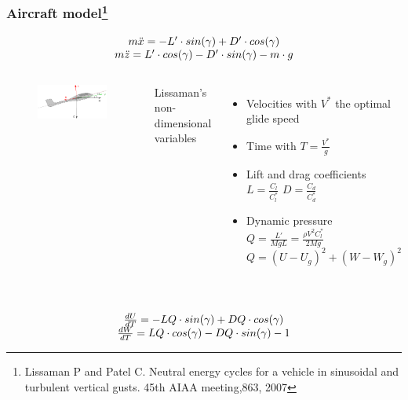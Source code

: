 \documentclass[compress]{beamer}
\begin{document}
\begin{frame}%
  \frametitle{Aircraft model\footnote{\tiny Lissaman P and Patel C. Neutral energy cycles for a vehicle in sinusoidal and turbulent vertical gusts. 45th AIAA meeting,863, 2007}}
  \begin{equation*}
    \begin{array}[c]{c}
      m \ddot{x} = -L' \cdot sin(\gamma) + D' \cdot cos(\gamma) \\
      m \ddot{z} = L' \cdot cos(\gamma) - D' \cdot sin(\gamma) - m \cdot g
    \end{array}
  \end{equation*}
  \begin{columns}
    \begin{figure}[h]
      \centering
      \includegraphics[width=1\textwidth]{./Figures/glider.eps}
    \end{figure}
    Lissaman's non-dimensional variables
    \begin{itemize}
      \item Velocities with $V^{*}$ the optimal glide speed
      \item Time with $T=\frac{V^{*}}{g}$
      \item Lift and drag coefficients $L= \frac{C_l}{C_l^*}$ $D= \frac{C_d}{C_d^*}$
      \item Dynamic pressure $Q = \frac{L'}{MgL} = \frac{ \rho V^{2} C_l^* }{2Mg}$ $Q=(U-U_g)^2+ (W-W_g)^2$
    \end{itemize}
  \end{columns}
  \begin{equation*}
    \begin{array}[c]{c}
      \\
      \frac{dU}{dT}= -LQ \cdot sin(\gamma) + DQ \cdot cos(\gamma) \\
      \frac{dW}{dT}= LQ \cdot cos(\gamma) - DQ \cdot sin(\gamma) - 1
    \end{array}
  \end{equation*}
\end{frame}
\end{document}
